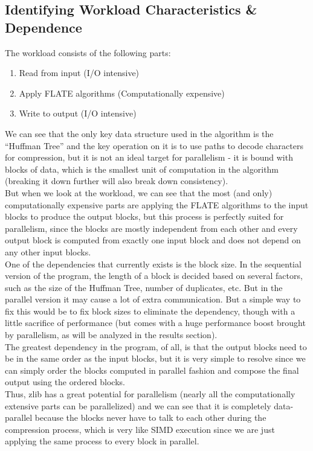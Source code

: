 \documentclass[12pt]{article}
\begin{document}
    \subsection{Identifying Workload Characteristics \& Dependence}
    The workload consists of the following parts:
    \begin{enumerate}
        \item Read from input (I/O intensive)
        \item Apply FLATE algorithms (Computationally expensive)
        \item Write to output (I/O intensive)
    \end{enumerate}
    We can see that the only key data structure used in the algorithm is the ``Huffman Tree'' and the key operation on it is to use paths to decode characters for compression, but it is not an ideal target for parallelism - it is bound with blocks of data, which is the smallest unit of computation in the algorithm (breaking it down further will also break down consistency).\\
    But when we look at the workload, we can see that the most (and only) computationally expensive parts are applying the FLATE algorithms to the input blocks to produce the output blocks, but this process is perfectly suited for parallelism, since the blocks are mostly independent from each other and every output block is computed from exactly one input block and does not depend on any other input blocks.\\
    One of the dependencies that currently exists is the block size. In the sequential version of the program, the length of a block is decided based on several factors, such as the size of the Huffman Tree, number of duplicates, etc. But in the parallel version it may cause a lot of extra communication. But a simple way to fix this would be to fix block sizes to eliminate the dependency, though with a little sacrifice of performance (but comes with a huge performance boost brought by parallelism, as will be analyzed in the results section).\\
    The greatest dependency in the program, of all, is that the output blocks need to be in the same order as the input blocks, but it is very simple to resolve since we can simply order the blocks computed in parallel fashion and compose the final output using the ordered blocks.\\
    Thus, zlib has a great potential for parallelism (nearly all the computationally extensive parts can be parallelized) and we can see that it is completely data-parallel because the blocks never have to talk to each other during the compression process, which is very like SIMD execution since we are just applying the same process to every block in parallel.
\end{document}
